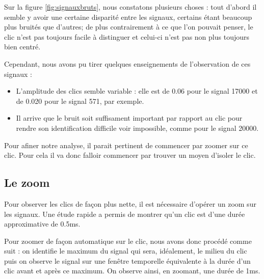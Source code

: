 Sur la figure \ref{fig:signauxbruts}, nous constatons plusieurs choses : tout d'abord il semble y avoir une certaine disparité entre les signaux, certains étant beaucoup plus bruités que d'autres; de plus contrairement à ce que l'on pouvait penser, le clic n'est pas toujours facile à distinguer et celui-ci n'est pas non plus toujours bien centré.

Cependant, nous avons pu tirer quelques enseignements de l'observation de ces signaux :
\begin{itemize}
\item L'amplitude des clics semble variable : elle est de 0.06 pour le signal 17000 et de 0.020 pour le signal 571, par exemple.
\item Il arrive que le bruit soit suffisament important par rapport au clic pour rendre son identification difficile voir impossible, comme pour le signal 20000.
\end{itemize}

Pour afiner notre analyse, il parait pertinent de commencer par zoomer sur ce clic.
Pour cela il va donc falloir commencer par trouver un moyen d'isoler le clic.

\hypertarget{Le-zoom}{%
\subsection{Le zoom}
\label{Le-zoom}}

Pour observer les clics de façon plus nette, il est nécessaire d'opérer un zoom
sur les signaux. Une étude rapide a permis de montrer qu'un clic
est d'une durée approximative de 0.5ms.

Pour zoomer de façon automatique sur le clic, nous avons donc procédé comme
suit :
on identifie le maximum du signal qui sera, idéalement, le milieu du clic puis
on observe le signal sur une fenêtre temporelle équivalente à la durée d'un clic
avant et après ce maximum. On observe ainsi, en zoomant, une durée de 1ms.


